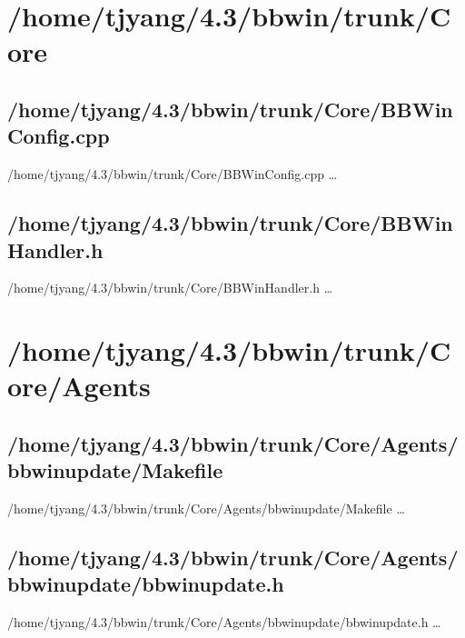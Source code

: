 \section{/home/tjyang/4.3/bbwin/trunk/Core}


\subsection{/home/tjyang/4.3/bbwin/trunk/Core/BBWinConfig.cpp}
\lstset{numberstyle=\tiny,numbers=left,
   breaklines=true,
   stepnumber=1,numbersep=5pt,firstnumber=1,
   xleftmargin=12pt,showstringspaces=false}
\noindent /home/tjyang/4.3/bbwin/trunk/Core/BBWinConfig.cpp  \ldots



\subsection{/home/tjyang/4.3/bbwin/trunk/Core/BBWinHandler.h}
\lstset{numberstyle=\tiny,numbers=left,
   breaklines=true,
   stepnumber=1,numbersep=5pt,firstnumber=1,
   xleftmargin=12pt,showstringspaces=false}
\noindent /home/tjyang/4.3/bbwin/trunk/Core/BBWinHandler.h  \ldots



\section{/home/tjyang/4.3/bbwin/trunk/Core/Agents}



\subsection{/home/tjyang/4.3/bbwin/trunk/Core/Agents/bbwinupdate/Makefile}
\lstset{numberstyle=\tiny,numbers=left,
   breaklines=true,
   stepnumber=1,numbersep=5pt,firstnumber=1,
   xleftmargin=12pt,showstringspaces=false}
\noindent /home/tjyang/4.3/bbwin/trunk/Core/Agents/bbwinupdate/Makefile  \ldots



\subsection{/home/tjyang/4.3/bbwin/trunk/Core/Agents/bbwinupdate/bbwinupdate.h}
\lstset{numberstyle=\tiny,numbers=left,
   breaklines=true,
   stepnumber=1,numbersep=5pt,firstnumber=1,
   xleftmargin=12pt,showstringspaces=false}
\noindent /home/tjyang/4.3/bbwin/trunk/Core/Agents/bbwinupdate/bbwinupdate.h  \ldots




